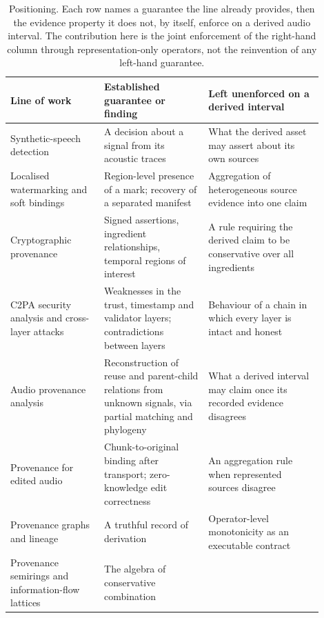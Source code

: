 \documentclass[preprint,3p,11pt,authoryear]{elsarticle}
\begin{document}
\begin{table}[t]
\centering
\caption{Positioning. Each row names a guarantee the line already provides, then
the evidence property it does not, by itself, enforce on a derived audio
interval. The contribution here is the joint enforcement of the right-hand
column through representation-only operators, not the reinvention of any
left-hand guarantee.}
\label{tab:related}
\small
\begin{tabular}{p{0.27\linewidth}p{0.30\linewidth}p{0.33\linewidth}}
\toprule
Line of work & Established guarantee or finding & Left unenforced on a derived interval \\
\midrule
Synthetic-speech detection \citep{wang2026asvspoof5,pham2025survey} &
A decision about a signal from its acoustic traces &
What the derived asset may assert about its own sources \\
\addlinespace
Localised watermarking and soft bindings \citep{sanroman2024audioseal,c2pa24} &
Region-level presence of a mark; recovery of a separated manifest &
Aggregation of heterogeneous source evidence into one claim \\
\addlinespace
Cryptographic provenance \citep{c2pa24} &
Signed assertions, ingredient relationships, temporal regions of interest &
A rule requiring the derived claim to be conservative over all ingredients \\
\addlinespace
C2PA security analysis and cross-layer attacks
\citep{golaszewski2026c2pa,nemecek2026contradictions} &
Weaknesses in the trust, timestamp and validator layers; contradictions between
layers &
Behaviour of a chain in which every layer is intact and honest \\
\addlinespace
Audio provenance analysis \citep{gerhardt2024provenance} &
Reconstruction of reuse and parent-child relations from unknown signals, via
partial matching and phylogeny &
What a derived interval may claim once its recorded evidence disagrees \\
\addlinespace
Provenance for edited audio \citep{ono2026merklespeech,fu2026trustvoice} &
Chunk-to-original binding after transport; zero-knowledge edit correctness &
An aggregation rule when represented sources disagree \\
\addlinespace
Provenance graphs and lineage \citep{w3c2013prov} &
A truthful record of derivation &
Operator-level monotonicity as an executable contract \\
\addlinespace
Provenance semirings and information-flow lattices
\citep{green2007provenance,denning1976lattice} &
The algebra of conservative combination &

\end{tabular}
\end{table}
\end{document}
